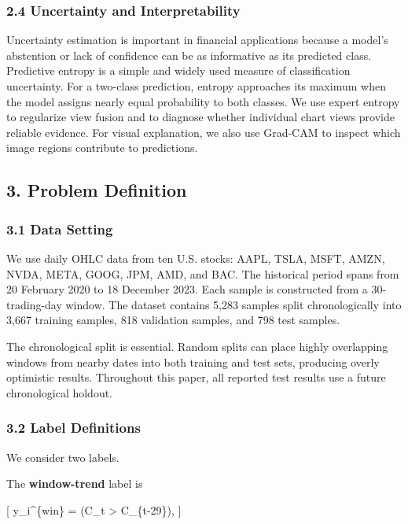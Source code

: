 \documentclass[
]{article}
\begin{document}
\subsubsection{2.4 Uncertainty and
Interpretability}\label{uncertainty-and-interpretability}

Uncertainty estimation is important in financial applications because a
model's abstention or lack of confidence can be as informative as its
predicted class. Predictive entropy is a simple and widely used measure
of classification uncertainty. For a two-class prediction, entropy
approaches its maximum when the model assigns nearly equal probability
to both classes. We use expert entropy to regularize view fusion and to
diagnose whether individual chart views provide reliable evidence. For
visual explanation, we also use Grad-CAM to inspect which image regions
contribute to predictions.

\subsection{3. Problem Definition}\label{problem-definition}

\subsubsection{3.1 Data Setting}\label{data-setting}

We use daily OHLC data from ten U.S. stocks: AAPL, TSLA, MSFT, AMZN,
NVDA, META, GOOG, JPM, AMD, and BAC. The historical period spans from 20
February 2020 to 18 December 2023. Each sample is constructed from a
30-trading-day window. The dataset contains 5,283 samples split
chronologically into 3,667 training samples, 818 validation samples, and
798 test samples.

The chronological split is essential. Random splits can place highly
overlapping windows from nearby dates into both training and test sets,
producing overly optimistic results. Throughout this paper, all reported
test results use a future chronological holdout.

\subsubsection{3.2 Label Definitions}\label{label-definitions}

We consider two labels.

The \textbf{window-trend} label is

{[} y\_i\^{}\{win\} = (C\_t \textgreater{} C\_\{t-29\}), {]}
\end{document}
